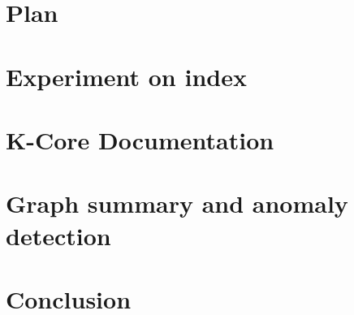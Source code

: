 \documentclass[12pt]{article}
\begin{document}
\section{Plan}
    \label{sec:plan}
    
    
\section{Experiment on index}
    \label{sec:indexexp}
    

%     

\section{K-Core Documentation}
   \label{sec:kcoredoc}
   

\section{Graph summary and anomaly detection}
   \label{sec:graphsummary}
   

\section{Conclusion}
   \label{sec:conclusion}
   




\newpage
{}
\tableofcontents
\end{document}
